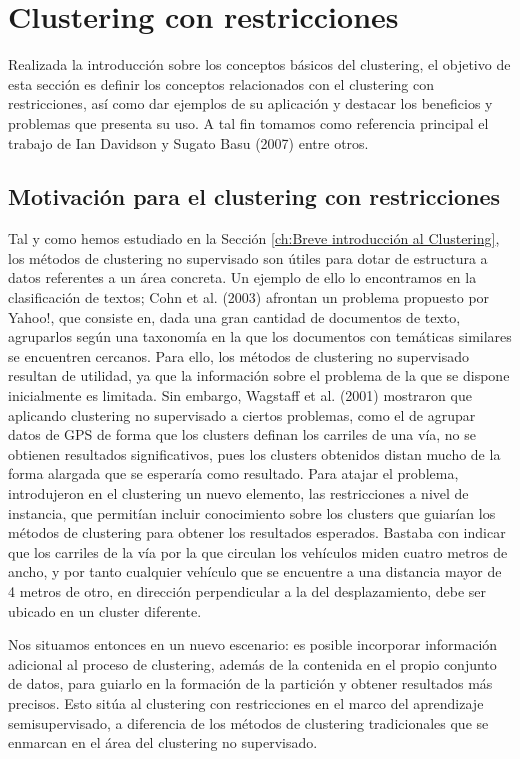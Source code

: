 \chapter{Clustering con restricciones}\label{ch:Clustering con restricciones}

Realizada la introducción sobre los conceptos básicos del clustering, el objetivo de esta sección es definir los conceptos relacionados con el clustering con restricciones, así como dar ejemplos de su aplicación y destacar los beneficios y problemas que presenta su uso. A tal fin tomamos como referencia principal el trabajo de Ian Davidson y Sugato Basu (2007) \cite{Survey:2007} entre otros.

\section{Motivación para el clustering con restricciones}

Tal y como hemos estudiado en la Sección \ref{ch:Breve introducción al Clustering}, los métodos de clustering no supervisado son útiles para dotar de estructura a datos referentes a un área concreta. Un ejemplo de ello lo encontramos en la clasificación de textos; Cohn et al. (2003) \cite{Cohn:2003} afrontan un problema propuesto por Yahoo!, que consiste en, dada una gran cantidad de documentos de texto, agruparlos según una taxonomía en la que los documentos con temáticas similares se encuentren cercanos. Para ello, los métodos de clustering no supervisado resultan de utilidad, ya que la información sobre el problema de la que se dispone inicialmente es limitada. Sin embargo, Wagstaff et al. (2001) mostraron que aplicando clustering no supervisado a ciertos problemas, como el de agrupar datos de GPS de forma que los clusters definan los carriles de una vía, no se obtienen resultados significativos, pues los clusters obtenidos distan mucho de la forma alargada que se esperaría como resultado. Para atajar el problema, introdujeron en el clustering un nuevo elemento, las restricciones a nivel de instancia, que permitían incluir conocimiento sobre los clusters que guiarían los métodos de clustering para obtener los resultados esperados. Bastaba con indicar que los carriles de la vía por la que circulan los vehículos miden cuatro metros de ancho, y por tanto cualquier vehículo que se encuentre a una distancia mayor de 4 metros de otro, en dirección perpendicular a la del desplazamiento, debe ser ubicado en un cluster diferente.

Nos situamos entonces en un nuevo escenario: es posible incorporar información adicional al proceso de clustering, además de la contenida en el propio conjunto de datos, para guiarlo en la formación de la partición y obtener resultados más precisos. Esto sitúa al clustering con restricciones en el marco del aprendizaje semisupervisado, a diferencia de los métodos de clustering tradicionales que se enmarcan en el área del clustering no supervisado. 

